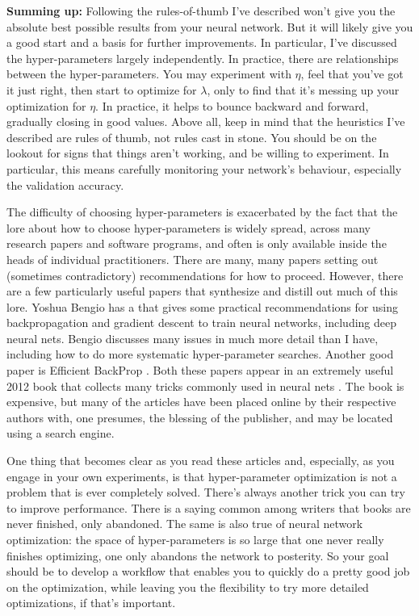 \textbf{Summing up:} Following the rules-of-thumb I've described won't give you the absolute best possible results from your neural network. But it will likely give you a good start and a basis for further improvements. In particular, I've discussed the hyper-parameters largely independently. In practice, there are relationships between the hyper-parameters. You may experiment with $\eta$, feel that you've got it just right, then start to optimize for $\lambda$, only to find that it's messing up your optimization for $\eta$. In practice, it helps to bounce backward and forward, gradually closing in good values. Above all, keep in mind that the heuristics I've described are rules of thumb, not rules cast in stone. You should be on the lookout for signs that things aren't working, and be willing to experiment. In particular, this means carefully monitoring your network's behaviour, especially the validation accuracy.

The difficulty of choosing hyper-parameters is exacerbated by the fact that the lore about how to choose hyper-parameters is widely spread, across many research papers and software programs, and often is only available inside the heads of individual practitioners. There are many, many papers setting out (sometimes contradictory) recommendations for how to proceed. However, there are a few particularly useful papers that synthesize and distill out much of this lore. Yoshua Bengio has a  \cite{Bengio2012} that gives some practical recommendations for using backpropagation and gradient descent to train neural networks, including deep neural nets. Bengio discusses many issues in much more detail than I have, including how to do more systematic hyper-parameter searches. Another good paper is Efficient BackProp \cite{LeCun:1998:EB:645754.668382}. Both these papers appear in an extremely useful 2012 book that collects many tricks commonly used in neural nets \cite{Montavon:2012:NNT:2480981}. The book is expensive, but many of the articles have been placed online by their respective authors with, one presumes, the blessing of the publisher, and may be located using a search engine.


One thing that becomes clear as you read these articles and, especially, as you engage in your own experiments, is that hyper-parameter optimization is not a problem that is ever completely solved. There's always another trick you can try to improve performance. There is a saying common among writers that books are never finished, only abandoned. The same is also true of neural network optimization: the space of hyper-parameters is so large that one never really finishes optimizing, one only abandons the network to posterity. So your goal should be to develop a workflow that enables you to quickly do a pretty good job on the optimization, while leaving you the flexibility to try more detailed optimizations, if that's important.

